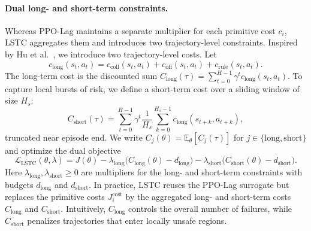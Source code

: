 \documentclass[11pt]{article}
\begin{document}
\paragraph{Dual long- and short-term constraints.}
Whereas PPO-Lag maintains a separate multiplier for each primitive cost $c_i$, LSTC aggregates them and introduces two trajectory-level constraints.
Inspired by Hu et al.~\cite{hu2024lstc}, we introduce two trajectory-level costs.
Let
\begin{equation}
  c_{\text{long}}(s_t,a_t)
  = c_{\text{coll}}(s_t,a_t)
  + c_{\text{off}}(s_t,a_t)
  + c_{\text{rule}}(s_t,a_t).
\end{equation}
The long-term cost is the discounted sum
$C_{\text{long}}(\tau)=\sum_{t=0}^{H-1}\gamma^t c_{\text{long}}(s_t,a_t)$.
To capture local bursts of risk, we define a short-term cost over a sliding window of size $H_s$:
\begin{equation}
  C_{\text{short}}(\tau)
  = \sum_{t=0}^{H-1} \gamma^t \frac{1}{H_s}\sum_{k=0}^{H_s-1} c_{\text{long}}(s_{t+k},a_{t+k}),
\end{equation}
truncated near episode end.
We write $C_j(\theta)=\mathbb{E}_\theta[C_j(\tau)]$ for $j\in\{\text{long},\text{short}\}$ and optimize the dual objective
\begin{equation}
  \mathcal{L}_{\text{LSTC}}(\theta,\lambda)
  = J(\theta)
  - \lambda_{\text{long}}\big(C_{\text{long}}(\theta)-d_{\text{long}}\big)
  - \lambda_{\text{short}}\big(C_{\text{short}}(\theta)-d_{\text{short}}\big).
  \label{eq:lstc-lagrangian}
\end{equation}
Here $\lambda_{\text{long}},\lambda_{\text{short}}\ge 0$ are multipliers for the long- and short-term constraints with budgets $d_{\text{long}}$ and $d_{\text{short}}$.
In practice, LSTC reuses the PPO-Lag surrogate but replaces the primitive costs $J_i^{\text{cost}}$ by the aggregated long- and short-term costs $C_{\text{long}}$ and $C_{\text{short}}$.
Intuitively, $C_{\text{long}}$ controls the overall number of failures, while $C_{\text{short}}$ penalizes trajectories that enter locally unsafe regions.
\end{document}
